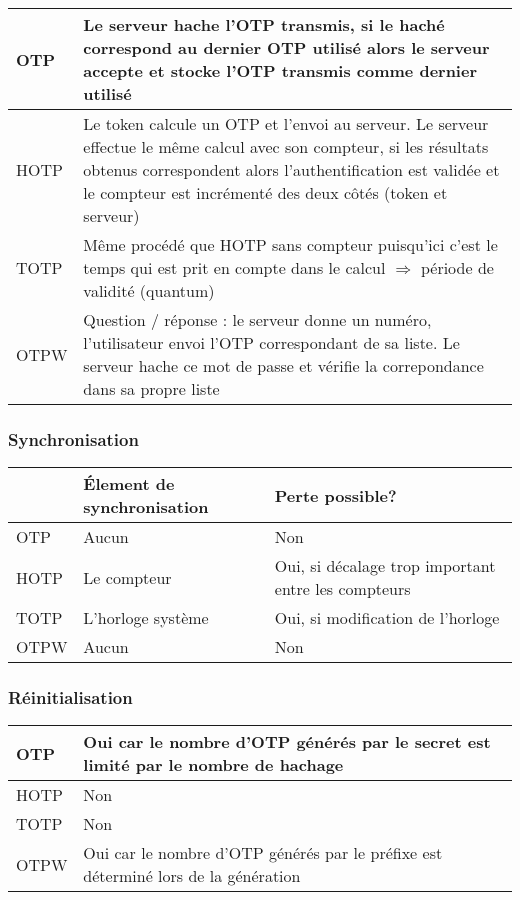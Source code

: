 	\begin{tabular}{| p{3cm} | p{12cm}}
		\hline
		OTP & Le serveur hache l'OTP transmis, si le haché correspond au
		dernier OTP utilisé alors le serveur accepte et stocke l'OTP transmis
		comme dernier utilisé \\
		\hline
		HOTP & Le token calcule un OTP et l'envoi au serveur. Le serveur
		effectue le même calcul avec son compteur, si les résultats obtenus
		correspondent alors l'authentification est validée et le compteur est
		incrémenté des deux côtés (token et serveur) \\
		\hline
		TOTP & Même procédé que HOTP sans compteur puisqu'ici c'est le temps
		qui est prit en compte dans le calcul $\Rightarrow$ période de
		validité (quantum) \\
		\hline
		OTPW & Question / réponse : le serveur donne un numéro, l'utilisateur
		envoi l'OTP correspondant de sa liste. Le serveur hache ce mot de
		passe et vérifie la correpondance dans sa propre liste\\
		\hline
	\end{tabular}

\subsubsection{Synchronisation}

	\begin{tabular}{| p{3cm} | p{4cm} | p{8cm} |}
		\hline
		& \cellcolor{gray} Élement de synchronisation & \cellcolor{gray} Perte
		possible? \\
		\hline
		OTP & Aucun & Non \\
		\hline
		HOTP & Le compteur & Oui, si décalage trop important entre les
		compteurs \\
		\hline
		TOTP & L'horloge système & Oui, si modification de l'horloge \\
		\hline
		OTPW & Aucun & Non \\
		\hline
	\end{tabular}

\subsubsection{Réinitialisation}

	\begin{tabular}{| p{3cm} | p{12cm}}
		\hline
		OTP & Oui car le nombre d'OTP générés par le secret est limité par le
		nombre de hachage \\
		\hline
		HOTP & Non \\
		\hline
		TOTP & Non \\
		\hline
		OTPW & Oui car le nombre d'OTP générés par le préfixe est déterminé
		lors de la génération \\
		\hline
	\end{tabular}

